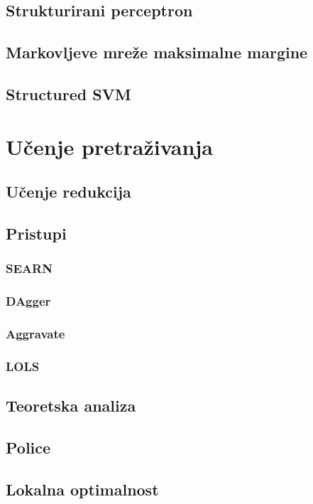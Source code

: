 \documentclass[times, utf8, diplomski]{fer}
\begin{document}
\section{Strukturirani perceptron}

\section{Markovljeve mreže maksimalne margine}

\section{Structured SVM}

\chapter{Učenje pretraživanja}

\section{Učenje redukcija}
\section{Pristupi}
\subsection{SEARN}
\subsection{DAgger}
\subsection{Aggravate}
\subsection{LOLS}
\section{Teoretska analiza}
\section{Police}
\section{Lokalna optimalnost}
\end{document}
